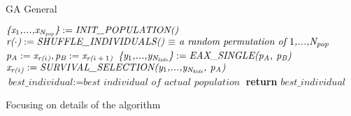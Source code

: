 \begin{algorithm}
\caption{GA General}\label{alg:gagen}
\begin{algorithmic}[1]
\State $\textit{\{x\textsubscript{$1$},...,x\textsubscript{N\textsubscript{pop}}\}} := \textit{INIT\_POPULATION()}$
	\State $\textit{r($\cdot$)} := \textit{SHUFFLE\_INDIVIDUALS() $\equiv$ a random permutation of $1$,...,N\textsubscript{pop} } $
		\State $\textit{p\textsubscript{A}} := \textit{x\textsubscript{r($i$)}} , \textit{p\textsubscript{B}} := \textit{x\textsubscript{r($i+1$)}} $
		\State $\textit{\{y\textsubscript{$1$},...,y\textsubscript{N\textsubscript{kids}}\}} := \textit{EAX\_SINGLE(p\textsubscript{A}, p\textsubscript{B})}$
		\State $\textit{x\textsubscript{r($i$)}} := \textit{SURVIVAL\_SELECTION(y\textsubscript{$1$},...,y\textsubscript{N\textsubscript{kids}}, p\textsubscript{A})} $
	\EndFor
	\State $\textit{best\_individual} := \textit{best individual of actual population}$
\EndWhile
\State \textbf{return} $best\_individual$
\EndProcedure
\end{algorithmic}
\end{algorithm}

Focusing on details of the algorithm
